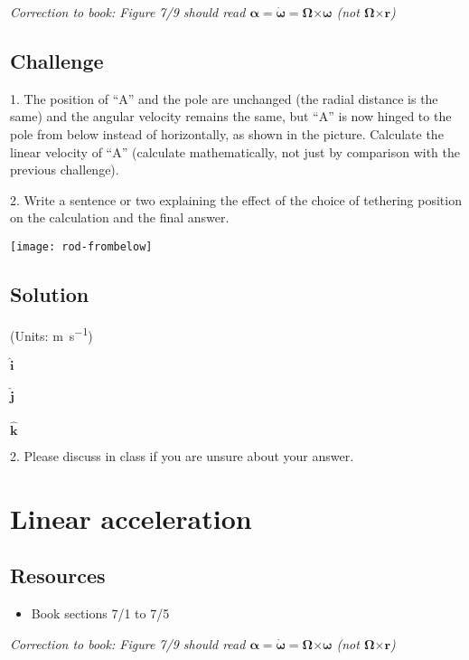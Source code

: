 \emph{Correction to book: Figure 7/9 should read $\bm{\alpha} = \bm{\dot{\omega}} = \bm{\Omega} \bm{\times} \bm{\omega}$ (not $\bm{\Omega} \bm{\times} \bm{r}$)}

\subsection*{Challenge}
1. The position of ``A'' and the pole are unchanged (the radial distance is the same) and the angular velocity remains the same, but ``A'' is now hinged to the pole from below instead of horizontally, as shown in the picture. Calculate the linear velocity of ``A'' (calculate mathematically, not just by comparison with the previous challenge).

2. Write a sentence or two explaining the effect of the choice of tethering position on the calculation and the final answer.

\texttt{[image: rod-frombelow]}

\subsection*{Solution}
(Units: \si{\meter\per\second})

$\bm{\hat{i}}$\\
\\

$\bm{\hat{j}}$\\
\\

$\bm{\hat{k}}$\\

2. Please discuss in class if you are unsure about your answer.




\newpage
\section{Linear acceleration}

\subsection*{Resources}
\begin{itemize}
    \item Book sections 7/1 to 7/5
\end{itemize}

\emph{Correction to book: Figure 7/9 should read $\bm{\alpha} = \bm{\dot{\omega}} = \bm{\Omega} \bm{\times} \bm{\omega}$ (not $\bm{\Omega} \bm{\times} \bm{r}$)}

